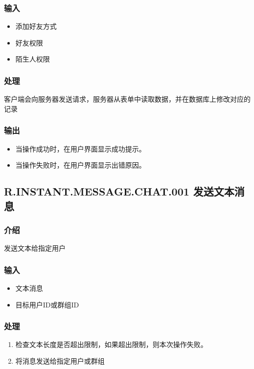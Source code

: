 {\subsubsection{输入}
\begin{itemize}
	\item 添加好友方式
	\item 好友权限
	\item 陌生人权限
\end{itemize}
\subsubsection{处理}
客户端会向服务器发送请求，服务器从表单中读取数据，并在数据库上修改对应的记录
\subsubsection{输出}
\begin{itemize}
	\item 当操作成功时，在用户界面显示成功提示。
	\item 当操作失败时，在用户界面显示出错原因。
\end{itemize}
}


\subsection{R.INSTANT.MESSAGE.CHAT.001 发送文本消息}
\subsubsection{介绍}
发送文本给指定用户

\subsubsection{输入}
\begin{itemize}
	\item 文本消息
	\item 目标用户ID或群组ID
\end{itemize}

\subsubsection{处理}
\begin{enumerate}
	\item 检查文本长度是否超出限制，如果超出限制，则本次操作失败。
	\item 将消息发送给指定用户或群组

	\end{enumerate}

